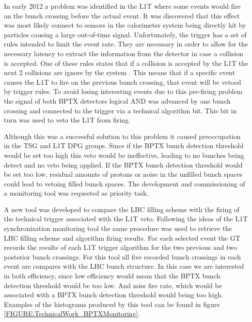 In early 2012 a problem was identified in the \gls{L1T} where some events would fire on the bunch crossing before the actual event. It was discovered that this effect was most likely connect to sensors in the calorimeter system being directly hit by particles causing a large out-of-time signal. Unfortunately, the trigger has a set of rules intended to limit the event rate. They are necessary in order to allow for the necessary latency to extract the information from the detector in case a collision is accepted. One of these rules states that if a collision is accepted by the \gls{L1T} the next 2 collisions are ignore by the system \cite{CMSTDR:CMSTridasTDRVol1}. This means that if a specific event causes the \gls{L1T} to fire on the previous bunch crossing, that event will be vetoed by trigger rules. To avoid losing interesting events due to this pre-firing problem the signal of both \gls{BPTX} detectors logical AND was advanced by one bunch crossing and connected to the trigger via a technical algorithm bit. This bit in turn was used to veto the \gls{L1T} from firing.

Although this was a successful solution to this problem it caused preoccupation in the \gls{TSG} and \gls{L1T} \gls{DPG} groups. Since if the \gls{BPTX} bunch detection threshold would be set too high this veto would be ineffective, leading to no bunches being detect and no veto being applied. If the \gls{BPTX} bunch detection threshold would be set too low, residual amounts of protons or noise in the unfilled bunch spaces could lead to vetoing filled bunch spaces. The development and commissioning of a monitoring tool was requested as priority task.

A new tool was developed to compare the \gls{LHC} filling scheme with the firing of the technical trigger associated with the \gls{L1T} veto. Following the ideas of the \gls{L1T} synchronization monitoring tool the same procedure was used to retrieve the \gls{LHC} filling scheme and algorithm firing results. For each selected event the \gls{GT} records the results of each \gls{L1T} trigger algorithm for the two previous and two posterior bunch crossings. For this tool all five recorded bunch crossings in each event are compares with the \gls{LHC} bunch structure. In this case we are interested in both efficiency, since low efficiency would mean that the \gls{BPTX} bunch detection threshold would be too low. And miss fire rate, which would be associated with a \gls{BPTX} bunch detection threshold would being too high. Examples of the histograms produced by this tool can be found in figure \ref{FIGURE:TechnicalWork_BPTXMonitoring}.

